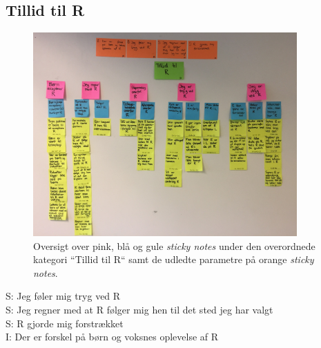 \subsection{Tillid til R}
%
\begin{figure}[H]
\centering
\includegraphics[width = 0.9\textwidth]{Figure/AffinityDiagram/TillidTilR} 
\caption{Oversigt over pink, blå og gule \textit{sticky notes} under den overordnede kategori ``Tillid til R`` samt de udledte parametre på orange \textit{sticky notes}.}
\label{fig:AFTillidTilR}
\end{figure}
\noindent
%
S: Jeg føler mig tryg ved R\\
S: Jeg regner med at R følger mig hen til det sted jeg har valgt\\
S: R gjorde mig forstrækket\\
I: Der er forskel på børn og voksnes oplevelse af R